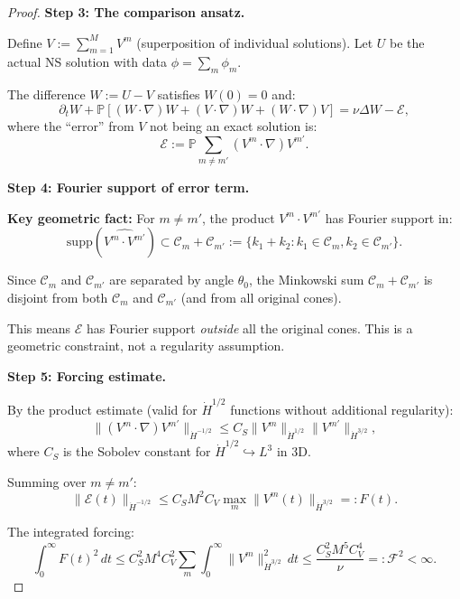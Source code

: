\documentclass[11pt]{article}
\theoremstyle{definition}
\begin{document}
\begin{proof}
\textbf{Step 3: The comparison ansatz.}

Define $V := \sum_{m=1}^M V^m$ (superposition of individual solutions). Let $U$ be the actual NS solution with data $\phi = \sum_m \phi_m$.

The difference $W := U - V$ satisfies $W(0) = 0$ and:
\begin{equation}\label{eq:W-eqn}
\partial_t W + \mathbb{P}[(W \cdot \nabla)W + (V \cdot \nabla)W + (W \cdot \nabla)V] = \nu \Delta W - \mathcal{E},
\end{equation}
where the ``error'' from $V$ not being an exact solution is:
\begin{equation}
\mathcal{E} := \mathbb{P} \sum_{m \neq m'} (V^m \cdot \nabla)V^{m'}.
\end{equation}

\textbf{Step 4: Fourier support of error term.}

\textbf{Key geometric fact:} For $m \neq m'$, the product $V^m \cdot V^{m'}$ has Fourier support in:
\begin{equation}
\text{supp}(\widehat{V^m \cdot V^{m'}}) \subset \mathcal{C}_m + \mathcal{C}_{m'} := \{k_1 + k_2 : k_1 \in \mathcal{C}_m, k_2 \in \mathcal{C}_{m'}\}.
\end{equation}

Since $\mathcal{C}_m$ and $\mathcal{C}_{m'}$ are separated by angle $\theta_0$, the Minkowski sum $\mathcal{C}_m + \mathcal{C}_{m'}$ is disjoint from both $\mathcal{C}_m$ and $\mathcal{C}_{m'}$ (and from all original cones).

This means $\mathcal{E}$ has Fourier support \emph{outside} all the original cones. This is a geometric constraint, not a regularity assumption.

\textbf{Step 5: Forcing estimate.}

By the product estimate (valid for $\dot{H}^{1/2}$ functions without additional regularity):
\begin{equation}
\|(V^m \cdot \nabla)V^{m'}\|_{\dot{H}^{-1/2}} \leq C_S \|V^m\|_{\dot{H}^{1/2}} \|V^{m'}\|_{\dot{H}^{3/2}},
\end{equation}
where $C_S$ is the Sobolev constant for $\dot{H}^{1/2} \hookrightarrow L^3$ in 3D.

Summing over $m \neq m'$:
\begin{equation}
\|\mathcal{E}(t)\|_{\dot{H}^{-1/2}} \leq C_S M^2 C_V \max_m \|V^m(t)\|_{\dot{H}^{3/2}} =: F(t).
\end{equation}

The integrated forcing:
\begin{equation}
\int_0^\infty F(t)^2 \, dt \leq C_S^2 M^4 C_V^2 \sum_m \int_0^\infty \|V^m\|_{\dot{H}^{3/2}}^2 \, dt \leq \frac{C_S^2 M^5 C_V^4}{\nu} =: \mathcal{F}^2 < \infty.
\end{equation}


\end{proof}
\end{document}

